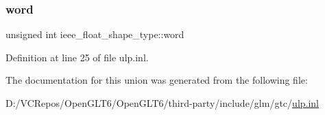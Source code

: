 \subsubsection{\texorpdfstring{word}{word}}
{\footnotesize\ttfamily unsigned int ieee\+\_\+float\+\_\+shape\+\_\+type\+::word}



Definition at line 25 of file ulp.\+inl.



The documentation for this union was generated from the following file\+:\begin{DoxyCompactItemize}
\item 
D\+:/\+V\+C\+Repos/\+Open\+G\+L\+T6/\+Open\+G\+L\+T6/third-\/party/include/glm/gtc/\mbox{\hyperlink{ulp_8inl}{ulp.\+inl}}\end{DoxyCompactItemize}
